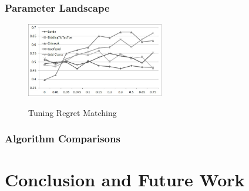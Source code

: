 \documentclass[conference]{IEEEtran}
\begin{document}
\subsubsection{Parameter Landscape}


\begin{figure}[t!]
\centering
\includegraphics[width=6.0cm]{figures/regretmatchingtuning.jpg}\\
\caption{Tuning Regret Matching}
\label{fig:tuning1}
\end{figure}



\subsubsection{Algorithm Comparisons}




\section{Conclusion and Future Work}
\label{sec:conc}


%
%
\end{document}
